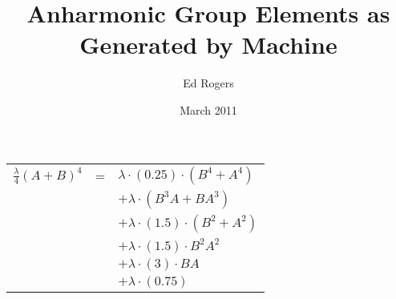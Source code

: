 \documentclass{article}
\title{Anharmonic Group Elements as Generated by Machine}
\author{Ed Rogers}
\date{March 2011}
\begin{document}
   \maketitle
\begin{table}[!hp]
\begin{center}
\begin{tabular}{rcl}
$\frac{\lambda}{4}(A+B)^{4}$ & = & ${\lambda}{\cdot}(0.25){\cdot}(B^{4}+A^{4})$ \\
                               &   & $ + {\lambda}{\cdot}(B^{3}A+BA^{3})$ \\
                               &   & $ + {\lambda}{\cdot}(1.5){\cdot}(B^{2}+A^{2})$ \\
                               &   & $ + {\lambda}{\cdot}(1.5){\cdot}B^{2}A^{2}$ \\
                               &   & $ + {\lambda}{\cdot}(3){\cdot}BA$ \\
                               &   & $ + {\lambda}{\cdot}(0.75)$ \\
\end{tabular}
\end{center}
\end{table}

\newpage
\end{document}

